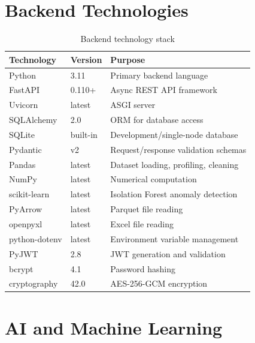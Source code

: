 \documentclass[12pt,a4paper]{report}
\begin{document}
\section{Backend Technologies}

\begin{table}[H]
\centering
\caption{Backend technology stack}
\begin{tabularx}{\textwidth}{llX}
\toprule
\textbf{Technology} & \textbf{Version} & \textbf{Purpose} \\
\midrule
Python          & 3.11   & Primary backend language \\
FastAPI         & 0.110+ & Async REST API framework \\
Uvicorn         & latest & ASGI server \\
SQLAlchemy      & 2.0    & ORM for database access \\
SQLite          & built-in & Development/single-node database \\
Pydantic        & v2     & Request/response validation schemas \\
Pandas          & latest & Dataset loading, profiling, cleaning \\
NumPy           & latest & Numerical computation \\
scikit-learn    & latest & Isolation Forest anomaly detection \\
PyArrow         & latest & Parquet file reading \\
openpyxl        & latest & Excel file reading \\
python-dotenv   & latest & Environment variable management \\
PyJWT           & 2.8    & JWT generation and validation \\
bcrypt          & 4.1    & Password hashing \\
cryptography    & 42.0   & AES-256-GCM encryption \\
\bottomrule
\end{tabularx}
\end{table}

\section{AI and Machine Learning}
\end{document}
